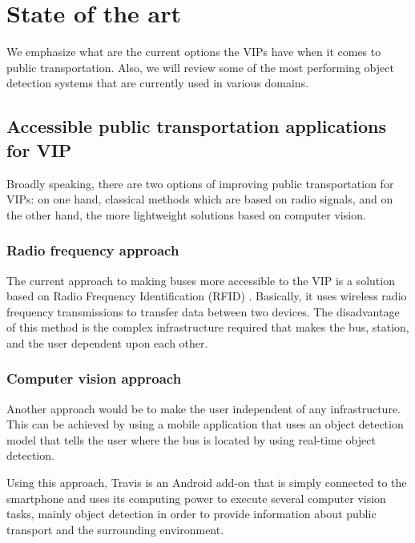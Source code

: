 \section{State of the art} \label{soa}
    We emphasize what are the current options the VIPs have when it comes to public transportation. Also, we will review some of the most performing object detection systems that are currently used in various domains.
    \subsection{Accessible public transportation applications for VIP}
        
        Broadly speaking, there are two options of improving public transportation for VIPs: on one hand, classical methods which are based on radio signals, and on the other hand, the more lightweight solutions based on computer vision.
    
    \subsubsection{Radio frequency approach}
        The current approach to making buses more accessible to the VIP is a solution based on Radio Frequency Identification (RFID) \cite{busIdentificationSystem}. Basically, it uses wireless radio frequency transmissions to transfer data between two devices. The disadvantage of this method is the complex infrastructure required that makes the bus, station, and the user dependent upon each other. 
        
    \subsubsection{Computer vision approach}
        Another approach would be to make the user independent of any infrastructure. This can be achieved by using a mobile application that uses an object detection model that tells the user where the bus is located by using real-time object detection. 
        
        Using this approach, Travis \cite{travis} is an Android add-on that is simply connected to the smartphone and uses its computing power to execute several computer vision tasks, mainly object detection in order to provide information about public transport and the surrounding environment.
        
